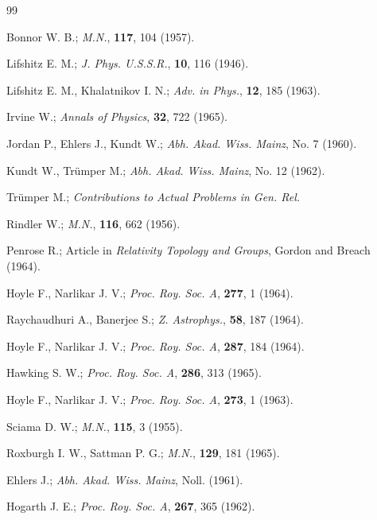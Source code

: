 \begin{thebibliography}{99}

 Bonnor W. B.; \textit{M.N.}, \textbf{117}, 104 (1957).

 Lifshitz E. M.; \textit{J. Phys. U.S.S.R.}, \textbf{10}, 116 (1946).

 Lifshitz E. M., Khalatnikov I. N.; \textit{Adv. in Phys.}, \textbf{12}, 185 (1963).

 Irvine W.; \textit{Annals of Physics}, \textbf{32}, 722 (1965).

 Jordan P., Ehlers J., Kundt W.; \textit{Abh. Akad. Wiss. Mainz}, No. 7 (1960).

 Kundt W., Trümper M.; \textit{Abh. Akad. Wiss. Mainz}, No. 12 (1962).

 Trümper M.; \textit{Contributions to Actual Problems in Gen. Rel.}

 Rindler W.; \textit{M.N.}, \textbf{116}, 662 (1956).

 Penrose R.; Article in \textit{Relativity Topology and Groups}, Gordon and Breach (1964).

 Hoyle F., Narlikar J. V.; \textit{Proc. Roy. Soc. A}, \textbf{277}, 1 (1964).

 Raychaudhuri A., Banerjee S.; \textit{Z. Astrophys.}, \textbf{58}, 187 (1964).

 Hoyle F., Narlikar J. V.; \textit{Proc. Roy. Soc. A}, \textbf{287}, 184 (1964).

 Hawking S. W.; \textit{Proc. Roy. Soc. A}, \textbf{286}, 313 (1965).

 Hoyle F., Narlikar J. V.; \textit{Proc. Roy. Soc. A}, \textbf{273}, 1 (1963).

 Sciama D. W.; \textit{M.N.}, \textbf{115}, 3 (1955).

 Roxburgh I. W., Sattman P. G.; \textit{M.N.}, \textbf{129}, 181 (1965).

 Ehlers J.; \textit{Abh. Akad. Wiss. Mainz}, Noll. (1961).

 Hogarth J. E.; \textit{Proc. Roy. Soc. A}, \textbf{267}, 365 (1962).

\end{thebibliography}
